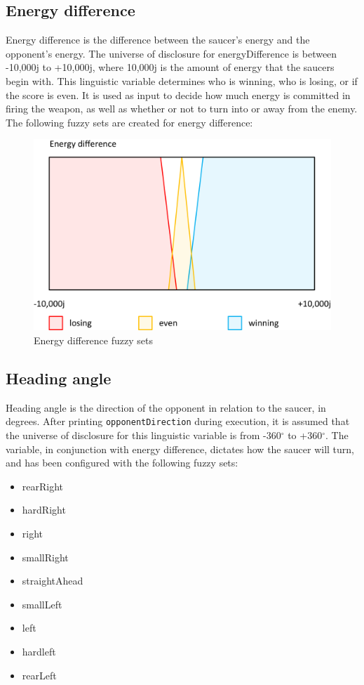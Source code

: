 \subsection{Energy difference}

Energy difference is the difference between the saucer's energy and the opponent's energy. The universe of disclosure for energyDifference is between -10,000j to +10,000j, where 10,000j is the amount of energy that the saucers begin with. This linguistic variable determines who is winning, who is losing, or if the score is even. It is used as input to decide how much energy is committed in firing the weapon, as well as whether or not to turn into or away from the enemy. The following fuzzy sets are created for energy difference:

\begin{figure}[H]
\centering
\caption{Energy difference fuzzy sets}
\includegraphics[scale=0.1]{./img/pdf/energyDiffSets.pdf}
\end{figure}

\subsection{Heading angle}

Heading angle is the direction of the opponent in relation to the saucer, in degrees. After printing \texttt{opponentDirection} during execution, it is assumed that the universe of disclosure for this linguistic variable is from -360$^{\circ}$ to +360$^{\circ}$. The variable, in conjunction with energy difference, dictates how the saucer will turn, and has been configured with the following fuzzy sets:

\begin{itemize}
	\item rearRight
	\item hardRight
	\item right
	\item smallRight
	\item straightAhead
	\item smallLeft
	\item left
	\item hardleft
	\item rearLeft
\end{itemize}